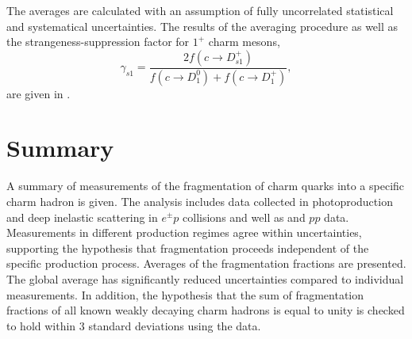 \tabexcited
The averages are calculated with an assumption of fully uncorrelated 
statistical and systematical uncertainties. The results of the averaging 
procedure as well as  the strangeness-suppression  factor 
for $1^{+}$ charm mesons, 
$$
\gamma_{s1}=\frac{2f(c\rightarrow D^+_{s1})}
{f(c\rightarrow D^0_1)+f(c\rightarrow D^+_1)},
$$ are given in .
\FloatBarrier
\tabFINALexcited
\FloatBarrier
\section{Summary}                      
\label{sec:con}
A summary of measurements of the fragmentation of charm quarks into a
specific charm hadron is given. 
%
The analysis includes data collected in photoproduction and deep 
inelastic scattering in $e^{\pm}p$ collisions and well as \epem and $pp$
 data.
%
Measurements in different production regimes agree within uncertainties, 
supporting the hypothesis that fragmentation proceeds independent of the 
specific production process. 
%
Averages of the fragmentation fractions are presented. 
%
The global average has significantly reduced uncertainties compared 
to individual measurements.
%
In addition, the hypothesis that the sum of fragmentation fractions 
of all known weakly decaying charm hadrons is equal to unity is
checked to hold within $3$ standard deviations 
using the \epem data.
%
